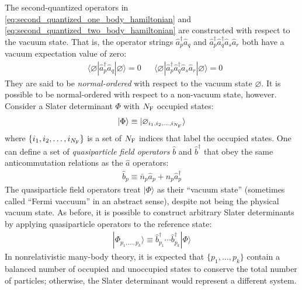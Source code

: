 \documentclass[amsmath, amssymb, aps, floatfix, nofootinbib, preprintnumbers,showpacs, superscriptaddress, twocolumn]{revtex4-1}
\newcommand{\ket}[1]{| #1 \rangle}
\newcommand{\bra}[1]{\langle #1 |}
\begin{document}
The second-quantized operators in
\eqref{eq:second_quantized_one_body_hamiltonian} and
\eqref{eq:second_quantized_two_body_hamiltonian} are constructed with respect
to the vacuum state.  That is, the operator strings
$\hat{a}_p^\dagger \hat{a}_q$ and
$\hat{a}_p^\dagger \hat{a}_q^\dagger \hat{a}_s \hat{a}_r$ both have a vacuum
expectation value of zero:
\begin{align*}
&\bra{\varnothing} \hat{a}_p^\dagger \hat{a}_q \ket{\varnothing} = 0 &
&\bra{\varnothing} \hat{a}_p^\dagger \hat{a}_q^\dagger \hat{a}_s \hat{a}_r \ket{\varnothing} = 0
\end{align*}
They are said to be \emph{normal-ordered} with respect to the vacuum state
$\varnothing$.  It is possible to be normal-ordered with respect to a
non-vacuum state, however.  Consider a Slater determinant $\Phi$ with
$N_{\text F}$ occupied states:
\begin{align*}
  \ket{\Phi} \equiv \ket{\varnothing_{i_1, i_2, \ldots, i_{N_{\text F}}}}
\end{align*}
where $\{i_1, i_2, \ldots, i_{N_{\text F}}\}$ is a set of $N_{\text F}$ indices that label the occupied states.  One can define a set of \textit{quasiparticle field operators} $\hat b$ and $\hat b^\dagger$ that obey the same anticommutation relations as the $\hat a$ operators:
\begin{align*}
  \hat b_p \equiv \bar n_p \hat a_{p} + n_p \hat a_{p}^\dagger
\end{align*}
The quasiparticle field operators treat $\ket{\Phi}$ as their ``vacuum state'' (sometimes called ``Fermi vaccuum'' in an abstract sense), despite not being the physical vacuum state.  As before, it is possible to construct arbitrary Slater determinants by applying quasiparticle operators to the reference state:
\begin{align*}
  \ket{\Phi_{p_1, \ldots, p_k}} \equiv \hat{b}^\dagger_{p_1} \cdots \hat{b}^\dagger_{p_k} \ket{\Phi}
\end{align*}
In nonrelativistic many-body theory, it is expected that $\{p_1, \ldots, p_k\}$ contain a balanced number of occupied and unoccupied states to conserve the total number of particles; otherwise, the Slater determinant would represent a different system.
\end{document}
